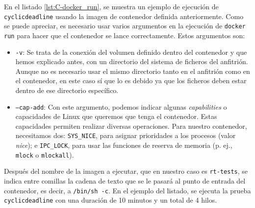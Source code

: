 En el listado \ref{lst:C-docker_run}, se muestra un ejemplo de ejecución de
\texttt{cyclicdeadline} usando la imagen de contenedor definida anteriormente.
Como se puede apreciar, es necesario usar varios argumentos en la ejecución de
\texttt{docker run} para hacer que el contenedor se lance correctamente. Estos
argumentos son:

\begin{itemize}
    \item \texttt{-v}: Se trata de la conexión del volumen definido dentro del
          contenedor y que hemos explicado antes, con un directorio del sistema de
          ficheros del anfitrión. Aunque no es necesario usar el mismo directorio
          tanto en el anfitrión como en el contenedor, en este caso sí que lo es
          debido ya que los ficheros deben estar dentro de ese directorio específico.
    \item \texttt{--cap-add}: Con este argumento, podemos indicar algunas
          \textit{capabilities} o capacidades de Linux que queremos que tenga el
          contenedor. Estas capacidades permiten realizar diversas operaciones.
          Para nuestro contenedor, necesitamos dos: \texttt{SYS\_NICE}, para
          asignar prioridades a los procesos (valor \textit{nice}); e
          \texttt{IPC\_LOCK}, para usar las funciones de reserva de memoria (p.
          ej., \texttt{mlock} o \texttt{mlockall}).
\end{itemize}

Después del nombre de la imagen a ejecutar, que en nuestro caso es
\texttt{rt-tests}, se indica entre comillas la cadena de texto que se le pasará
al punto de entrada del contenedor, es decir, a \lstinline{/bin/sh -c}. En el
ejemplo del listado, se ejecuta la prueba \texttt{cyclicdeadline} con una
duración de 10 minutos y un total de 4 hilos.
